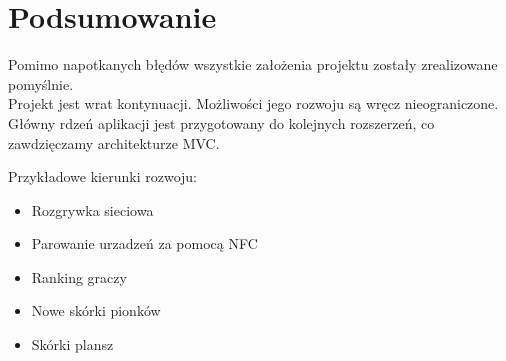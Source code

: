 \section{Podsumowanie}
Pomimo napotkanych błędów wszystkie założenia projektu zostały zrealizowane pomyślnie.\\
Projekt jest wrat kontynuacji. Możliwości jego rozwoju są wręcz nieograniczone. Główny rdzeń aplikacji jest przygotowany do kolejnych rozszerzeń, co zawdzięczamy architekturze MVC.

Przykładowe kierunki rozwoju:
\begin{itemize}
	\item Rozgrywka sieciowa
	\item Parowanie urzadzeń za pomocą NFC
	\item Ranking graczy
	\item Nowe skórki pionków
	\item Skórki plansz
\end{itemize}